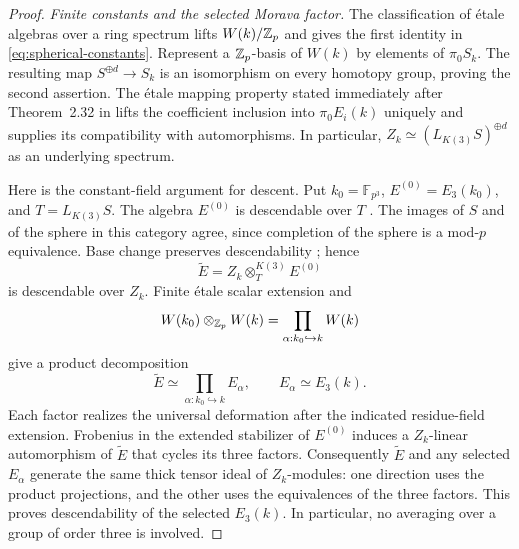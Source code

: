 \begin{proof}
\emph{Finite constants and the selected Morava factor.}
The classification of \'{e}tale algebras over a ring spectrum
\cite[Definition~2.31 and Theorem~2.32]{Mathew16} lifts
$W(k)/\mathbb Z_p$ and gives the first identity in
\eqref{eq:spherical-constants}.  Represent a $\mathbb Z_p$-basis of $W(k)$ by
elements of $\pi_0S_k$.  The resulting map $S^{\oplus d}\to S_k$ is an
isomorphism on every homotopy group, proving the second assertion.
The \'{e}tale mapping property stated immediately after Theorem~2.32 in
\citet{Mathew16} lifts the coefficient
inclusion into $\pi_0E_i(k)$ uniquely and supplies its compatibility with
automorphisms.  In particular,
$Z_k\simeq (L_{K(3)}S)^{\oplus d}$ as an underlying spectrum.

Here is the constant-field argument for descent.  Put
$k_0=\mathbb F_{p^3}$, $E^{(0)}=E_3(k_0)$, and $T=L_{K(3)}S$.
The algebra $E^{(0)}$ is descendable over $T$
\cite[Theorem~4.18 and Proposition~10.10]{Mathew16}.  The images of
$S$ and of the sphere in this category agree, since completion of the
sphere is a mod-$p$ equivalence.  Base change preserves descendability
\cite[Corollary~3.21]{Mathew16}; hence
\[
  \widetilde E=Z_k\otimes^{K(3)}_T E^{(0)}
\]
is descendable over $Z_k$.  Finite \'{e}tale scalar extension and
\[
  W(k_0)\otimes_{\mathbb Z_p}W(k)
    =\prod_{\alpha:k_0\hookrightarrow k}W(k)
\]
give a product decomposition
\[
  \widetilde E\simeq\prod_{\alpha:k_0\hookrightarrow k}E_\alpha,
  \qquad E_\alpha\simeq E_3(k).
\]
Each factor realizes the universal deformation after the indicated
residue-field extension.  Frobenius in the extended stabilizer of
$E^{(0)}$ induces a $Z_k$-linear automorphism of $\widetilde E$ that
cycles its three factors.  Consequently $\widetilde E$ and any selected
$E_\alpha$ generate the same thick tensor ideal of $Z_k$-modules:
one direction uses the product projections, and the other uses the
equivalences of the three factors.  This proves descendability of the
selected $E_3(k)$.  In particular, no averaging over a group of order
three is involved.


\end{proof}
